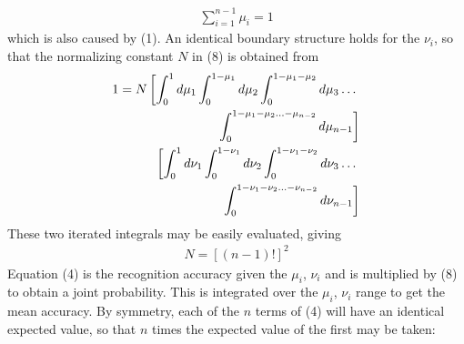 \documentclass[10pt, a4paper]{article}
\begin{document}
\begin{CJK*}{UTF8}{bsmi}
\begin{multicols}{2}
\begin{align}
    \sum_{i=1}^{n-1}\mu_i = 1
\end{align}
which is also caused by (1). 
An identical boundary structure holds for the $\nu_i$, so that the normalizing constant $N$ in (8) is obtained from 
\begin{align}
    1=N \left[ \int_0^1 d\mu_1 \int_0^{1-\mu_1} d\mu_2 \int_0^{1-\mu_1-\mu_2} d\mu_3 \dots \right. \notag \\
    \quad \left. \int_0^{1-\mu_1-\mu_2...-\mu_{n-2}} d\mu_{n-1} \right] \notag \\
    \left[ \int_0^1 d\nu_1 \int_0^{1-\nu_1} d\nu_2 \int_0^{1-\nu_1-\nu_2} d\nu_3 \dots \right. \notag \\
    \quad \left. \int_0^{1-\nu_1-\nu_2...-\nu_{n-2}} d\nu_{n-1} \right] 
\end{align}
\hspace{1em} These two iterated integrals may be easily evaluated, giving 
\begin{align}
    N=[(n-1)!]^2
\end{align}
\hspace{1em} Equation (4) is the recognition accuracy given the $\mu_i$, $\nu_i$ and is multiplied by (8) to obtain a joint probability. 
This is integrated over the $\mu_i$, $\nu_i$ range to get the mean accuracy. 
By symmetry, each of the $n$ terms of (4) will have an identical expected value, so that $n$ times the expected value of the first may be taken: 



\end{multicols}
\end{CJK*}
\end{document}
